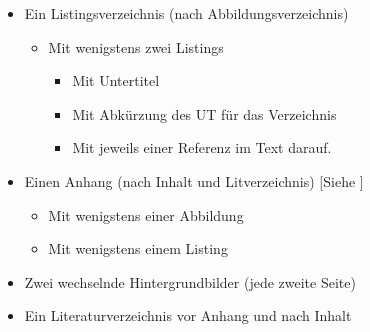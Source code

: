 \begin{itemize}
\begin{itemize}
\begin{itemize}
        \end{itemize}                                                                           
    \end{itemize}                                                                               
    \item Ein Listingsverzeichnis (nach Abbildungsverzeichnis)                                  
        \begin{itemize}                                                                         
            \item Mit wenigstens zwei Listings                                                  
                \begin{itemize}                                                                 
                    \item Mit Untertitel                                                        
                    \item Mit Abkürzung des UT für das Verzeichnis                              
                    \item Mit jeweils einer Referenz im Text darauf.                            
                \end{itemize}                                                                   
        \end{itemize}                                                                           
    \item Einen Anhang (nach Inhalt und Litverzeichnis)         [Siehe ]                              
        \begin{itemize}                                                                         
            \item Mit wenigstens einer Abbildung                                                
            \item Mit wenigstens einem Listing                                                             
        \end{itemize}                                                                           
    \item Zwei wechselnde Hintergrundbilder (jede zweite Seite)                                            
    \item Ein Literaturverzeichnis vor Anhang und nach Inhalt
    
    \newpage
    

\end{itemize}

